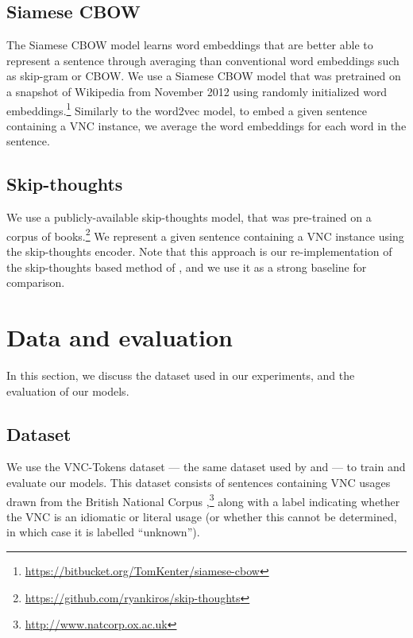 \documentclass[11pt,a4paper]{article}
\begin{document}
\subsection{Siamese CBOW}


The Siamese CBOW model \cite{kenter-borisov-derijke} learns word
embeddings that are better able to represent a sentence through
averaging than conventional word embeddings such as skip-gram or
CBOW. We use a Siamese CBOW model that was pretrained on a snapshot of
Wikipedia from November 2012 using randomly initialized word
embeddings.\footnote{\url{https://bitbucket.org/TomKenter/siamese-cbow}}
Similarly to the word2vec model, to embed a given sentence containing
a VNC instance, we average the word embeddings for each word in the
sentence.






\subsection{Skip-thoughts}


We use a publicly-available skip-thoughts model, that was pre-trained
on a corpus of
books.\footnote{\url{https://github.com/ryankiros/skip-thoughts}} We
represent a given sentence containing a VNC instance using the
skip-thoughts encoder.
Note that this approach is our re-implementation of the skip-thoughts
based method of , and we use it as a
strong baseline for comparison.

















\section{Data and evaluation}


In this section, we discuss the dataset used in our experiments, and
the evaluation of our models.

\subsection{Dataset}\label{dataset}

We use the VNC-Tokens dataset \citep{Cook2008} --- the same dataset
used by  and  --- to
train and evaluate our models. This dataset consists of sentences
containing VNC usages drawn from the British National Corpus
\citep{Burnard2000},\footnote{\url{http://www.natcorp.ox.ac.uk}} along
with a label indicating whether the VNC is an idiomatic or literal
usage (or whether this cannot be determined, in which case it is
labelled ``unknown''). 
\end{document}
